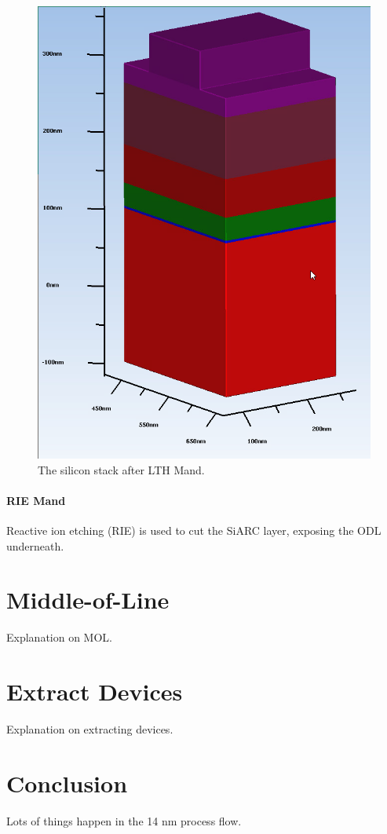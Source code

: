 \documentclass[conference]{IEEEtran}
\begin{document}
\begin{figure}[htbp]
\centerline{\includegraphics[width=\linewidth]{pics/lth_mand.png}}
\caption{The silicon stack after LTH Mand.}
\label{lth_mand}
\end{figure}

\paragraph{RIE Mand} Reactive ion etching (RIE) \cite{1481759} is used to cut
the SiARC layer, exposing the ODL underneath.

\section{Middle-of-Line}
Explanation on MOL.

\section{Extract Devices}
Explanation on extracting devices.

\section{Conclusion}
Lots of things happen in the 14 nm process flow.

\clearpage


\end{document}
